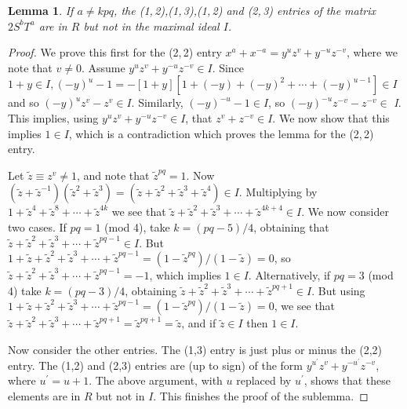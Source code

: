 \documentclass[reqno]{stml-l}
\theoremstyle{plain}
\newtheorem{lemma}[theorem]{Lemma}
\theoremstyle{definition}
\numberwithin{equation}{chapter}
\begin{document}
\begin{lemma}\label{ch04:lem4.9}
If $a\neq kpq$, the \emph{(1,\,2),(1,\,3),(1,\,2)} and \emph{(2,\,3)} entries of the matrix $2S^{b}T^{a}$ are in $R$ but not in the maximal ideal $I$.
\end{lemma}

\begin{proof}
We prove this first for the (2,\,2) entry $x^{a}+x^{-a}=y^{u}z^{v}+ y^{-u}z^{-v}$, where we note that $v\neq 0$. Assume $y^{u}z^{v}+y^{-u}z^{-v}\in I$. Since $1+y\in I,(-y)^{u}-1=-[1+y][1+(-y)+(-y)^{2}+\cdots+(-y)^{u-1}]\in I$ and so $(-y)^{u}z^{v}-z^{v}\in I$. Similarly, $(-y)^{-u}-1\in I$, so $(-y)^{-u}z^{-v}-z^{-v}\in$ \emph{I}. This implies, using $y^{u}z^{v}+y^{-u}z^{-v}\in I$, that $z^{v}+z^{-v}\in I$. We now show that this implies $1\in I$, which is a contradiction which proves the lemma for the (2,\,2) entry.

Let $\tilde{z}\equiv z^{v}\neq 1$, and note that $\tilde{z}^{pq}=1$. Now $(\tilde{z}+\tilde{z}^{-1})(\tilde{z}^{2}+\tilde{z}^{3})= (\tilde{z}+\tilde{z}^{2}+\tilde{z}^{3}+\tilde{z}^{4})\in I$. Multiplying by $1+\tilde{z}^{4}+\tilde{z}^{8}+\cdots+\tilde{z}^{4k}$ we see that $\tilde{z}+\tilde{z}^{2}+\tilde{z}^{3}+\cdots+\tilde{z}^{4k+4}\in I$. We now consider two cases. If $pq=1$ (mod 4), take $k=(pq-5)/4$, obtaining that $\tilde{z}+\tilde{z}^{2}+\tilde{z}^{3}+\cdots+\tilde{z}^{pq-1}\in I$. But $1+\tilde{z}+\tilde{z}^{2}+\tilde{z}^{3}+\cdots+\tilde{z}^{pq-1}=(1-\tilde{z}^{pq})/(1-\tilde{z})=0$, so $\tilde{z}+\tilde{z}^{2}+ \tilde{z}^{3}+\cdots+\tilde{z}^{pq-1}=-1$, which implies $1\in I$. Alternatively, if $pq=3$ (mod 4) take $k=(pq-3)/4$, obtaining $\tilde{z}+\tilde{z}^{2}+\tilde{z}^{3}+\cdots+\tilde{z}^{pq+1}\in I$. But using $1+\tilde{z}+\tilde{z}^{2}+\tilde{z}^{3}+\cdots+\tilde{z}^{pq-1}=(1-\tilde{z}^{pq})/(1-\tilde{z})=0$, we see that $\tilde{z}+\tilde{z}^{2}+\tilde{z}^{3}+\cdots+\tilde{z}^{pq+1}=\tilde{z}^{pq+1}=\tilde{z}$, and if $\tilde{z}\in I$ then $1\in I$.

Now consider the other entries. The (1,3) entry is just plus or minus the (2,2) entry. The (1,2) and (2,3) entries are (up to sign) of the form $y^{u^{\prime}}z^{v}+y^{-u^{\prime}}z^{-v}$, where $u^{\prime}=u+1$. The above argument, with $u$ replaced by $u^{\prime}$, shows that these elements are in $R$ but not in $I$. This finishes the proof of the sublemma.
\end{proof}
\end{document}
